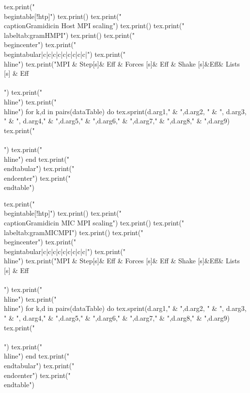 \begin{luacode*}
  tex.print("\\begin{table}[!htp]")
  tex.print()
  tex.print("\\caption{Gramidicin Host MPI scaling}")
  tex.print()
  tex.print("\\label{tab:gramHMPI}")
  tex.print()
  tex.print("\\begin{center}")
  tex.print("\\begin{tabular}{|c|c|c|c|c|c|c|c|c|}")
  tex.print("\\hline")
  tex.print("MPI & Step[s]& Eff & Forces [s]& Eff &  Shake [s]&Eff& Lists [s] & Eff\\\\")
  tex.print("\\hline")
  tex.print("\\hline")
  for k,d in pairs(dataTable) do
    tex.sprint(d.arg1," & ",d.arg2, " & ", d.arg3, " & ", d.arg4," & ",d.arg5," & ",d.arg6," & ",d.arg7," & ",d.arg8," & ",d.arg9)
    tex.print(" \\\\")
    tex.print("\\hline")
  end
  tex.print("\\end{tabular}")
  tex.print("\\end{center}")
  tex.print("\\end{table}")
\end{luacode*}
\begin{luacode*}
  tex.print("\\begin{table}[!htp]")
  tex.print()
  tex.print("\\caption{Gramidicin MIC MPI scaling}")
  tex.print()
  tex.print("\\label{tab:gramMICMPI}")
  tex.print()
  tex.print("\\begin{center}")
  tex.print("\\begin{tabular}{|c|c|c|c|c|c|c|c|c|}")
  tex.print("\\hline")
  tex.print("MPI & Step[s]& Eff & Forces [s]& Eff & Shake [s]&Eff& Lists [s] & Eff\\\\")
  tex.print("\\hline")
  tex.print("\\hline")
  for k,d in pairs(dataTable) do
    tex.sprint(d.arg1," & ",d.arg2, " & ", d.arg3, " & ", d.arg4," & ",d.arg5," & ",d.arg6," & ",d.arg7," & ",d.arg8," & ",d.arg9)
    tex.print(" \\\\")
    tex.print("\\hline")
  end
  tex.print("\\end{tabular}")
  tex.print("\\end{center}")
  tex.print("\\end{table}")
\end{luacode*}
